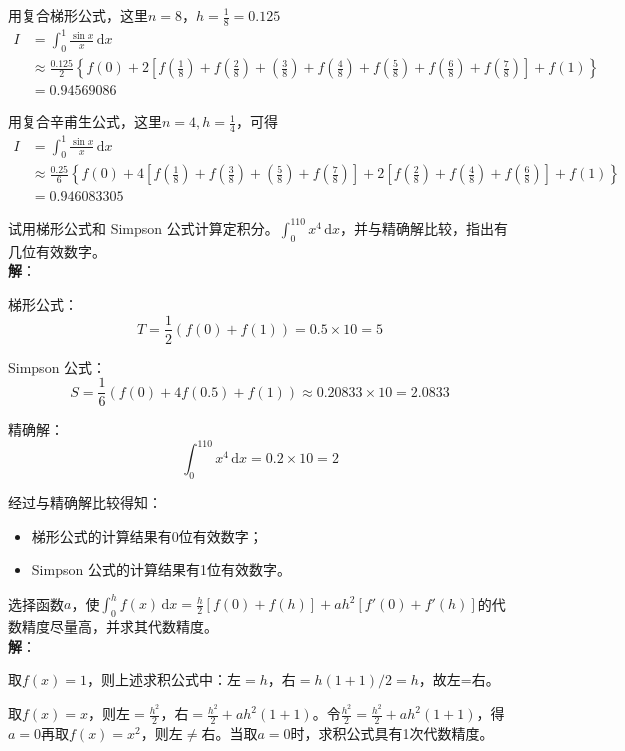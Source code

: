 \documentclass[UTF8,a4paper,11pt,oneside]{ctexbook}
\begin{document}
用复合梯形公式，这里\(n=8\)，\(h=\frac{1}{8}=0.125\)
\begin{align*}
    I & =\int_0^1\frac{\sin x}{x}\,\mathrm{d}x\\
    & \approx\frac{0.125}{2}\left\{f(0)+2\left[f\left(\frac{1}{8}\right)+f\left(\frac{2}{8}\right)+\left(\frac{3}{8}\right)+f\left(\frac{4}{8}\right)+f\left(\frac{5}{8}\right)+f\left(\frac{6}{8}\right)+f\left(\frac{7}{8}\right)\right]+f(1)\right\}\\
    & =0.94569086
\end{align*}

用复合辛甫生公式，这里\(n=4,h=\frac{1}{4}\)，可得
\begin{align*}
    I & =\int_0^1\frac{\sin x}{x}\,\mathrm{d}x\\
    & \approx\frac{0.25}{6}\left\{f(0)+4\left[f\left(\frac{1}{8}\right)+f\left(\frac{3}{8}\right)+\left(\frac{5}{8}\right)+f\left(\frac{7}{8}\right)\right]+2\left[f\left(\frac{2}{8}\right)+f\left(\frac{4}{8}\right)+f\left(\frac{6}{8}\right)\right]+f(1)\right\}\\
    & =0.946083305
\end{align*}

\vspace{4em}
试用梯形公式和 Simpson 公式计算定积分。\(\int_0^110x^4\,\mathrm{d}x\)，并与精确解比较，指出有几位有效数字。\\
\textbf{解}：

梯形公式：
\[
T=\frac{1}{2}(f(0)+f(1))=0.5\times10=5
\]

Simpson 公式：
\[
S=\frac{1}{6}(f(0)+4f(0.5)+f(1))\approx0.20833\times10=2.0833
\]

精确解：
\[
\int_0^110x^4\,\mathrm{d}x=0.2\times10=2
\]

经过与精确解比较得知：
\begin{itemize}
    \item 梯形公式的计算结果有0位有效数字；
    \item Simpson 公式的计算结果有1位有效数字。
\end{itemize}

\vspace{4em}
选择函数\(a\)，使\(\int_0^hf(x)\,\mathrm{d}x=\frac{h}{2}[f(0)+f(h)]+ah^2[f'(0)+f'(h)]\)的代数精度尽量高，并求其代数精度。\\
\textbf{解}：

取\(f(x)=1\)，则上述求积公式中：左\(=h\)，右\(=h(1+1)/2=h\)，故左=右。

取\(f(x)=x\)，则左\(=\frac{h^2}{2}\)，右\(=\frac{h^2}{2}+ah^2(1+1)\)。令\(\frac{h^2}{2}=\frac{h^2}{2}+ah^2(1+1)\)，得\(a=0\)再取\(f(x)=x^2\)，则左\(\neq\)右。当取\(a=0\)时，求积公式具有1次代数精度。
\end{document}
